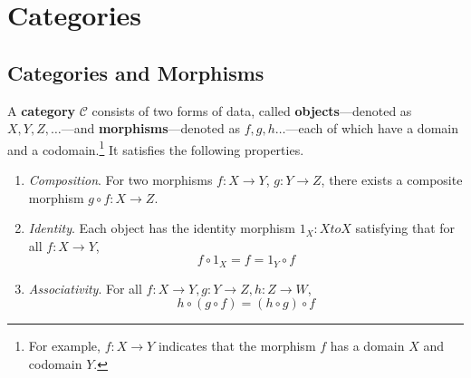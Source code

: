 \section{Categories} 

\subsection{Categories and Morphisms}

	\begin{definition}[Category]
	  \label{def:category}
		A \textbf{category} $\mathcal{C}$ consists of two forms of data, called \textbf{objects}---denoted as $X, Y, Z, \ldots$---and \textbf{morphisms}---denoted as $f, g, h \ldots$---each of which have a domain and a codomain.\footnote{For example, $f: X \to Y$ indicates that the morphism $f$ has a domain $X$ and codomain $Y$.} It satisfies the following properties. 
		\begin{enumerate}
			\item \textit{Composition}. For two morphisms $f: X \to Y$, $g: Y \to Z$, there exists a composite morphism $g \circ f: X \to Z$.  

		  \item \textit{Identity}. Each object has the identity morphism $1_X: X to X$ satisfying that for all $f: X \to Y$, 
				\begin{equation}
				  f \circ 1_X = f = 1_Y \circ f
				\end{equation}

			\item \textit{Associativity}. For all $f: X \to Y, g: Y \to Z, h: Z \to W$, 
				\begin{equation}
					h \circ (g \circ f) = (h \circ g) \circ f
				\end{equation}
		\end{enumerate}
	\end{definition}

